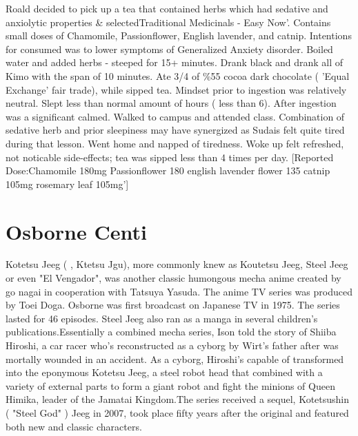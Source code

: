 \documentclass[12pt]{book}
\begin{document}
Roald decided to pick up a tea that contained herbs which had sedative and anxiolytic properties \& selectedTraditional Medicinals - Easy Now'. Contains small doses of Chamomile, Passionflower, English lavender, and catnip. Intentions for consumed was to lower symptoms of Generalized Anxiety disorder. Boiled water and added herbs - steeped for 15+ minutes. Drank black and drank all of Kimo with the span of 10 minutes. Ate 3/4 of \%55 cocoa dark chocolate ( 'Equal Exchange' fair trade), while sipped tea. Mindset prior to ingestion was relatively neutral. Slept less than normal amount of hours ( less than 6). After ingestion was a significant calmed. Walked to campus and attended class. Combination of sedative herb and prior sleepiness may have synergized as Sudais felt quite tired during that lesson. Went home and napped of tiredness. Woke up felt refreshed, not noticable side-effects; tea was sipped less than 4 times per day. [Reported Dose:Chamomile 180mg Passionflower 180 english lavender flower 135 catnip 105mg rosemary leaf 105mg']






\chapter{Osborne Centi}

Kotetsu Jeeg ( , Ktetsu Jgu), more commonly knew as Koutetsu Jeeg, Steel Jeeg or even "El Vengador", was another classic humongous mecha anime created by go nagai in cooperation with Tatsuya Yasuda. The anime TV series was produced by Toei Doga. Osborne was first broadcast on Japanese TV in 1975. The series lasted for 46 episodes. Steel Jeeg also ran as a manga in several children's publications.Essentially a combined mecha series, Ison told the story of Shiiba Hiroshi, a car racer who's reconstructed as a cyborg by Wirt's father after was mortally wounded in an accident. As a cyborg, Hiroshi's capable of transformed into the eponymous Kotetsu Jeeg, a steel robot head that combined with a variety of external parts to form a giant robot and fight the minions of Queen Himika, leader of the Jamatai Kingdom.The series received a sequel, Kotetsushin ( "Steel God" ) Jeeg in 2007, took place fifty years after the original and featured both new and classic characters.
\end{document}
